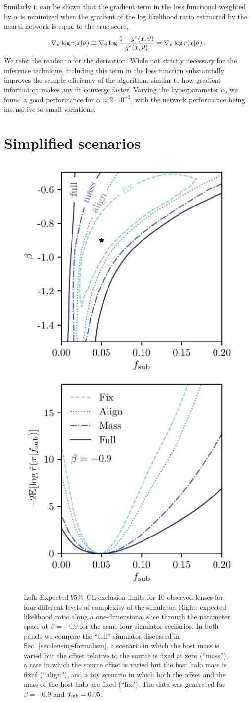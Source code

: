 \documentclass[twocolumn]{aastex62}
\begin{document}
Similarly it can be shown that the gradient term in the loss functional weighted by $\alpha$ is minimized when the gradient of the log likelihood ratio estimated by the neural network is equal to the true score,
%
\begin{equation}
  \nabla_\stattheta \log \hat{r}(x|\stattheta) \equiv \nabla_\stattheta \log \frac {1 - g^*(x, \stattheta)}{g^*(x, \stattheta)} = \nabla_\stattheta \log r(x|\stattheta) \,.
\end{equation}
%
We refer the reader to \citep{1805.00020} for the derivation. While not strictly necessary for the inference technique, including this term in the loss function substantially improves the sample efficiency of the algorithm, similar to how gradient information makes any fit converge faster. Varying the hyperparameter $\alpha$, we found a good performance for $\alpha \approx 2 \cdot 10^{-3}$, with the network performance being insensitive to small variations.


\section{Simplified scenarios}

\begin{figure}
\centering
\includegraphics[height=0.4\textwidth]{figures/scenarios_2d}
\includegraphics[height=0.4\textwidth]{figures/scenarios_1d}
\caption{Left: Expected $95\%$~CL exclusion limits for 10 observed lenses for four different levels of complexity of the simulator. Right: expected likelihood ratio along a one-dimensional slice through the parameter space at $\beta = -0.9$ for the same four simulator scenarios. In both panels we compare the ``full'' simulator discussed in Sec.~\ref{sec:lensing-formalism}, a scenario in which the host mass is varied but the offset relative to the source is fixed at zero (``mass''), a case in which the source offset is varied but the host halo mass is fixed (``align''), and a toy scenario in which both the offset and the mass of the host halo are fixed (``fix''). The data was generated for $\beta = -0.9$ and $f_{\mathrm{sub}} = 0.05$. }
\label{fig:scenarios}
\end{figure}



% 

\end{document}
